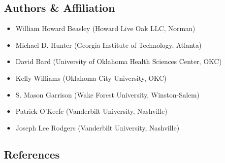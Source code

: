 \documentclass[smallextended]{svjour3}       %
\providecommand{\tightlist}{%
  \setlength{\itemsep}{0pt}\setlength{\parskip}{0pt}}
\begin{document}
\hypertarget{authors-affiliation}{%
\subsection{Authors \& Affiliation}\label{authors-affiliation}}

\begin{itemize}
\tightlist
\item
  William Howard Beasley (Howard Live Oak LLC, Norman)
\item
  Michael D. Hunter (Georgia Institute of Technology, Atlanta)
\item
  David Bard (University of Oklahoma Health Sciences Center, OKC)
\item
  Kelly Williams (Oklahoma City University, OKC)
\item
  S. Mason Garrison (Wake Forest University, Winston-Salem)
\item
  Patrick O'Keefe (Vanderbilt University, Nashville)
\item
  Joseph Lee Rodgers (Vanderbilt University, Nashville)
\end{itemize}

\hypertarget{references}{%
\subsection{References}\label{references}}



\end{document}
